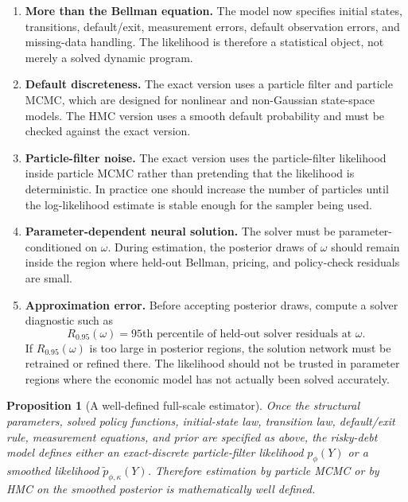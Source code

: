 \documentclass[11pt]{article}
\newtheorem{proposition}{Proposition}
\newcommand{\1}{\mathbf{1}}
\begin{document}
\begin{enumerate}[leftmargin=2em]
  \item \textbf{More than the Bellman equation.} The model now specifies
  initial states, transitions, default/exit, measurement errors, default
  observation errors, and missing-data handling. The likelihood is therefore a
  statistical object, not merely a solved dynamic program.

  \item \textbf{Default discreteness.} The exact version uses a particle filter
  and particle MCMC, which are designed for nonlinear and non-Gaussian
  state-space models. The HMC version uses a smooth default probability and
  must be checked against the exact version.

  \item \textbf{Particle-filter noise.} The exact version uses the
  particle-filter likelihood inside particle MCMC rather than pretending that
  the likelihood is deterministic. In practice one should increase the number
  of particles until the log-likelihood estimate is stable enough for the
  sampler being used.

  \item \textbf{Parameter-dependent neural solution.} The solver must be
  parameter-conditioned on \(\omega\). During estimation, the posterior draws of
  \(\omega\) should remain inside the region where held-out Bellman, pricing,
  and policy-check residuals are small.

  \item \textbf{Approximation error.} Before accepting posterior draws, compute
  a solver diagnostic such as
  \[
    R_{0.95}(\omega)
    =
    \text{95th percentile of held-out solver residuals at }\omega.
  \]
  If \(R_{0.95}(\omega)\) is too large in posterior regions, the solution
  network must be retrained or refined there. The likelihood should not be
  trusted in parameter regions where the economic model has not actually been
  solved accurately.
\end{enumerate}

\begin{proposition}[A well-defined full-scale estimator]
\label{prop:full-scale-estimator}
Once the structural parameters, solved policy functions, initial-state law,
transition law, default/exit rule, measurement equations, and prior are
specified as above, the risky-debt model defines either an exact-discrete
particle-filter likelihood \(p_\phi(Y)\) or a smoothed likelihood
\(\widetilde p_{\phi,\kappa}(Y)\). Therefore estimation by particle MCMC or by
HMC on the smoothed posterior is mathematically well defined.
\end{proposition}
\end{document}
